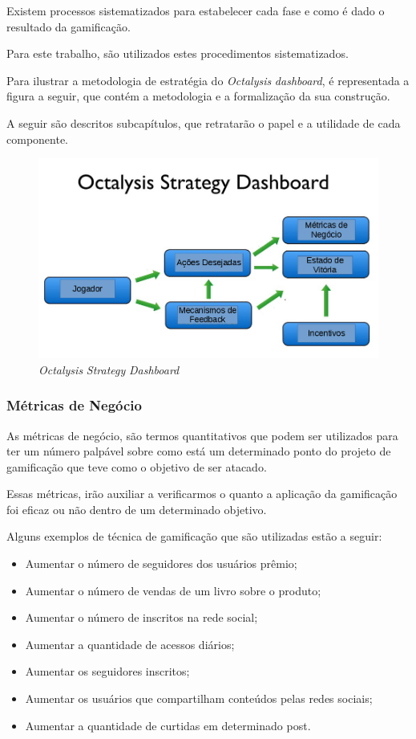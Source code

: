 Existem processos sistematizados para estabelecer cada fase e como é dado o
resultado da gamificação.

Para este trabalho, são utilizados estes procedimentos sistematizados.

Para ilustrar a metodologia de estratégia do \textit{Octalysis} \textit{dashboard}, é representada
a figura a seguir, que contém a metodologia e a formalização da sua construção.

A seguir são descritos subcapítulos, que retratarão o papel e a utilidade de
cada
componente.


 \begin{figure}[h]
     \centering

     \includegraphics[width=450px, scale=1]{figuras/dashboard}
     \caption{\textit{Octalysis} \textit{Strategy} \textit{Dashboard}}

     \label{fig:dashboard}
 \end{figure}

\subsubsection{Métricas de Negócio}
\label{sub:business_metrics}
As métricas de negócio, são termos quantitativos que podem ser utilizados
para ter um número palpável sobre como está um determinado ponto do projeto de gamificação
que teve como o objetivo de ser atacado.

Essas métricas, irão auxiliar a verificarmos o quanto a aplicação da gamificação
 foi eficaz ou
não dentro de um determinado objetivo.

Alguns exemplos de técnica de gamificação que são utilizadas estão a seguir:

\begin{itemize}
    \item Aumentar o número de seguidores dos usuários prêmio;
    \item Aumentar o número de vendas de um livro sobre o produto;
    \item Aumentar o número de inscritos na rede social;
    \item Aumentar a quantidade de acessos diários;
    \item Aumentar os seguidores inscritos;
    \item Aumentar os usuários que compartilham conteúdos pelas redes sociais;
    \item Aumentar a quantidade de curtidas em determinado post.
\end{itemize}

